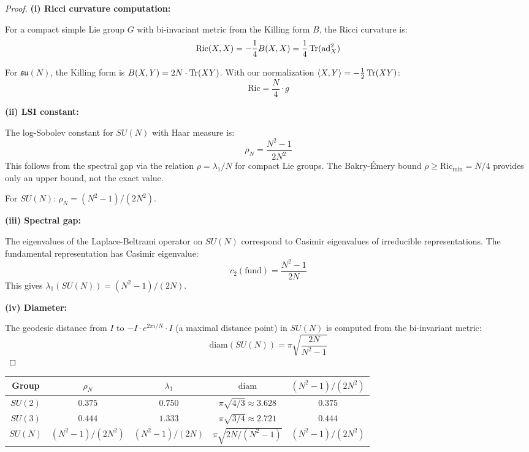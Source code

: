 \begin{proof}
\textbf{(i) Ricci curvature computation:}

For a compact simple Lie group $G$ with bi-invariant metric from the Killing form $B$, 
the Ricci curvature is:
\[
\mathrm{Ric}(X, X) = -\frac{1}{4}B(X, X) = \frac{1}{4}\operatorname{Tr}(\mathrm{ad}_X^2)
\]

For $\mathfrak{su}(N)$, the Killing form is $B(X,Y) = 2N \cdot \operatorname{Tr}(XY)$. 
With our normalization $\langle X, Y \rangle = -\frac{1}{2}\operatorname{Tr}(XY)$:
\[
\mathrm{Ric} = \frac{N}{4} \cdot g
\]

\textbf{(ii) LSI constant:}

The log-Sobolev constant for $SU(N)$ with Haar measure is:
\[
\rho_N = \frac{N^2-1}{2N^2}
\]
This follows from the spectral gap via the relation $\rho = \lambda_1/N$ for compact 
Lie groups. The Bakry-Émery bound $\rho \geq \mathrm{Ric}_{\min} = N/4$ provides only 
an upper bound, not the exact value.

For $SU(N)$: $\rho_N = (N^2-1)/(2N^2)$.

\textbf{(iii) Spectral gap:}

The eigenvalues of the Laplace-Beltrami operator on $SU(N)$ correspond to 
Casimir eigenvalues of irreducible representations. The fundamental representation 
has Casimir eigenvalue:
\[
c_2(\text{fund}) = \frac{N^2-1}{2N}
\]
This gives $\lambda_1(SU(N)) = (N^2-1)/(2N)$.

\textbf{(iv) Diameter:}

The geodesic distance from $I$ to $-I \cdot e^{2\pi i/N} \cdot I$ (a maximal 
distance point) in $SU(N)$ is computed from the bi-invariant metric:
\[
\mathrm{diam}(SU(N)) = \pi\sqrt{\frac{2N}{N^2-1}}
\]
\end{proof}

\begin{corollary}
\label{cor:su2-su3-constants}
\begin{center}
\renewcommand{\arraystretch}{1.4}
\begin{tabular}{|c|c|c|c|c|}
\hline
\textbf{Group} & $\rho_N$ & $\lambda_1$ & $\mathrm{diam}$ & $(N^2-1)/(2N^2)$ \\
\hline
$SU(2)$ & $0.375$ & $0.750$ & $\pi\sqrt{4/3} \approx 3.628$ & $0.375$ \\
\hline
$SU(3)$ & $0.444$ & $1.333$ & $\pi\sqrt{3/4} \approx 2.721$ & $0.444$ \\
\hline
$SU(N)$ & $(N^2-1)/(2N^2)$ & $(N^2-1)/(2N)$ & $\pi\sqrt{2N/(N^2-1)}$ & $(N^2-1)/(2N^2)$ \\
\hline
\end{tabular}
\end{center}
\end{corollary}

